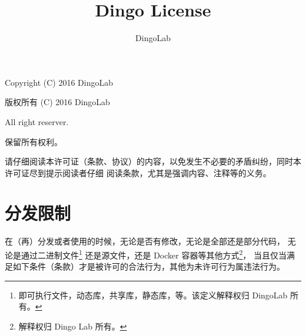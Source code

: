 








\makeatletter
\def\@NoStyleChaper{\ralex} %
\def\@LicenseDoc{\ralex} %
\def\@UsingAppendix{\ralex} %
\def\@DocType{article}
\def\@DocTypeCTEX{ctexart}
\makeatother


\doclass

\title{Dingo License}
\author{DingoLab}


  \maketitle

  \Huge{Copyright (C) 2016 DingoLab}
  \par
  \Huge{版权所有 (C) 2016 DingoLab}

  \par
  \Huge{All right reserver.}
  \par
  \Huge{保留所有权利。}

  \Huge{请仔细阅读本许可证（条款、协议）的内容，以免发生不必要的矛盾纠纷，同时本许可证尽到提示阅读者仔细
  阅读条款，尤其是强调内容、注释等的义务。}

  \section{分发限制}
  在（再）分发或者使用的时候，无论是否有修改，无论是全部还是部分代码，
  无论是通过二进制文件\footnote{即可执行文件，动态库，共享库，静态库，等。该定义解释权归 DingoLab 所有。}
  还是源文件，还是 Docker 容器等其他方式\footnote{解释权归 Dingo Lab 所有。}，
  当且仅当满足如下条件（条款）才是被许可的合法行为，其他为未许可行为属违法行为。

